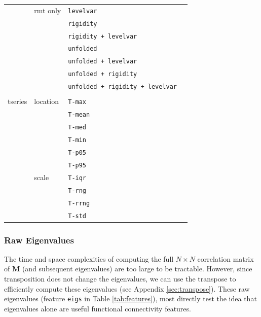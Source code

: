 \documentclass[12pt]{spieman}  %
\newcommand{\code}[1]{\small\texttt{#1}\normalsize}
\newcommand{\tcode}[1]{\footnotesize\texttt{#1}\normalsize}
\begin{document}
\begin{spacing}{2}
\begin{table}[h!]
\begin{tabular}{lllr}
               & rmt only      & \tcode{levelvar}                       \\
               &               & \tcode{rigidity}                       \\
               &               & \tcode{rigidity + levelvar}            \\
               &               & \tcode{unfolded}                       \\
               &               & \tcode{unfolded + levelvar}            \\
               &               & \tcode{unfolded + rigidity}            \\
               &               & \tcode{unfolded + rigidity + levelvar} \\
               &               &                                        \\
tseries        & location      & \tcode{T-max}                          \\
               &               & \tcode{T-mean}                         \\
               &               & \tcode{T-med}                          \\
               &               & \tcode{T-min}                          \\
               &               & \tcode{T-p05}                          \\
               &               & \tcode{T-p95}                          \\
               & scale         & \tcode{T-iqr}                          \\
               &               & \tcode{T-rng}                          \\
               &               & \tcode{T-rrng}                         \\
               &               & \tcode{T-std}                          \\
\hline
\end{tabular}
\end{table}

\subsubsection{Raw Eigenvalues}
\label{sec:raw-eigs}

The time and space complexities of computing the full \(N \times N\)
correlation matrix of \(\mathbf{M}\) (and subsequent eigenvalues) are too
large to be tractable. However, since transposition does not change the
eigenvalues, we can use the transpose to efficiently compute these eigenvalues
(see Appendix \ref{sec:transpose}). These raw eigenvalues (feature \code{eigs}
in Table \ref{tab:features}), most directly test the idea that eigenvalues
alone are useful functional connectivity features.


\end{spacing}
\end{document}
